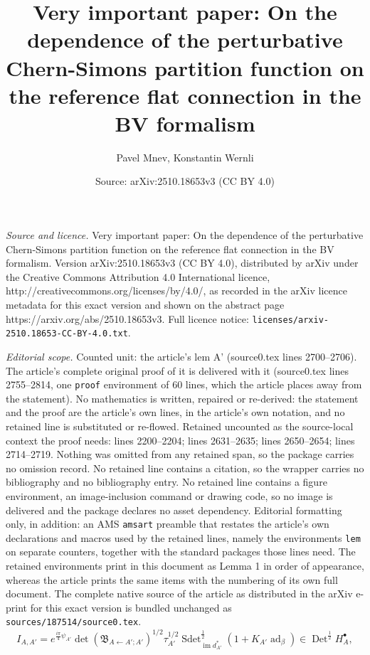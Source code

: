 \documentclass[10pt,a4paper]{amsart}
\title{Very important paper: On the dependence of the perturbative Chern-Simons partition function on the reference flat connection in the BV formalism}
\author{Pavel Mnev, Konstantin Wernli}
\date{Source: arXiv:2510.18653v3 (CC BY 4.0)}
\newcommand{\BB}{\mathfrak{B}}
\newcommand{\Det}{\operatorname{Det}}
\newcommand{\im}{\operatorname{im}}
\newcommand{\la}{\leftarrow}
\newcommand{\sdet}{\operatorname{Sdet}}
\begin{document}
\maketitle

\noindent\emph{Source and licence.} Very important paper: On the dependence of the perturbative Chern-Simons partition function on the reference flat connection in the BV formalism. Version arXiv:2510.18653v3 (CC BY 4.0), distributed by arXiv under the Creative Commons Attribution 4.0 International licence, http://creativecommons.org/licenses/by/4.0/, as recorded in the arXiv licence metadata for this exact version and shown on the abstract page https://arxiv.org/abs/2510.18653v3. Full licence notice: \texttt{licenses/arxiv-2510.18653-CC-BY-4.0.txt}.\par\smallskip

\noindent\textit{Editorial scope.} Counted unit: the article's lem A' (source0.tex lines 2700--2706). The article's complete original proof of it is delivered with it (source0.tex lines 2755--2814, one \texttt{proof} environment of 60 lines, which the article places away from the statement). No mathematics is written, repaired or re-derived: the statement and the proof are the article's own lines, in the article's own notation, and no retained line is substituted or re-flowed.  Retained uncounted as the source-local context the proof needs: lines 2200--2204; lines 2631--2635; lines 2650--2654; lines 2714--2719.  Nothing was omitted from any retained span, so the package carries no omission record.  No retained line contains a citation, so the wrapper carries no bibliography and no bibliography entry.  No retained line contains a figure environment, an image-inclusion command or drawing code, so no image is delivered and the package declares no asset dependency.  Editorial formatting only, in addition: an AMS \texttt{amsart} preamble that restates the article's own declarations and macros used by the retained lines, namely the environments \texttt{lem} on separate counters, together with the standard packages those lines need.  The retained environments print in this document as Lemma 1 in order of appearance, whereas the article prints the same items with the numbering of its own full document.  The complete native source of the article as distributed in the arXiv e-print for this exact version is bundled unchanged as \texttt{sources/187514/source0.tex}.
\begin{equation}\label{I def}
    I_{A,A'} = e^{\frac{i\pi}{4} \psi_{A'}}%
    \det(\BB_{A\la A';A'})^{1/2}
    \tau_{A'}^{1/2}\sdet^{\frac{1}{2}}_{\im d_{A'}^*}\left(1 + K_{A'}\operatorname{ad}_\beta\right) \in \Det^{\frac12} H^\bullet_{A},
\end{equation}
\end{document}
